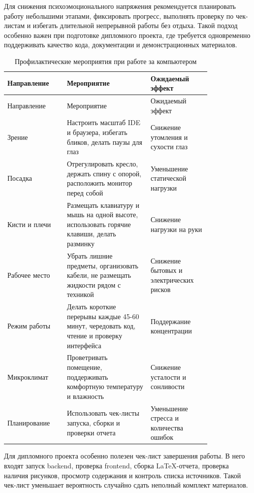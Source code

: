 Для снижения психоэмоционального напряжения рекомендуется планировать работу небольшими этапами, фиксировать прогресс, выполнять проверку по чек-листам и избегать длительной непрерывной работы без отдыха. Такой подход особенно важен при подготовке дипломного проекта, где требуется одновременно поддерживать качество кода, документации и демонстрационных материалов.


\noindent\scriptsize
\setlength{\tabcolsep}{3pt}
\renewcommand{\arraystretch}{1.18}
\begin{longtable}{|>{\RaggedRight\arraybackslash}p{0.24\linewidth}|>{\RaggedRight\arraybackslash}p{0.34\linewidth}|>{\RaggedRight\arraybackslash}p{0.24\linewidth}|}
\caption{Профилактические мероприятия при работе за компьютером}\label{tab:3-2}\\
\hline
Направление & Мероприятие & Ожидаемый эффект\\ \hline
\endfirsthead
\hline
Направление & Мероприятие & Ожидаемый эффект\\ \hline
\endhead
Зрение & Настроить масштаб IDE и браузера, избегать бликов, делать паузы для глаз & Снижение утомления и сухости глаз\\ \hline
Посадка & Отрегулировать кресло, держать спину с опорой, расположить монитор перед собой & Уменьшение статической нагрузки\\ \hline
Кисти и плечи & Размещать клавиатуру и мышь на одной высоте, использовать горячие клавиши, делать разминку & Снижение нагрузки на руки\\ \hline
Рабочее место & Убрать лишние предметы, организовать кабели, не размещать жидкости рядом с техникой & Снижение бытовых и электрических рисков\\ \hline
Режим работы & Делать короткие перерывы каждые 45-60 минут, чередовать код, чтение и проверку интерфейса & Поддержание концентрации\\ \hline
Микроклимат & Проветривать помещение, поддерживать комфортную температуру и влажность & Снижение усталости и сонливости\\ \hline
Планирование & Использовать чек-листы запуска, сборки и проверки отчета & Уменьшение стресса и количества ошибок\\ \hline
\end{longtable}
\normalsize


Для дипломного проекта особенно полезен чек-лист завершения работы. В него входят запуск backend, проверка frontend, сборка LaTeX-отчета, проверка наличия рисунков, просмотр содержания и контроль списка источников. Такой чек-лист уменьшает вероятность случайно сдать неполный комплект материалов.


